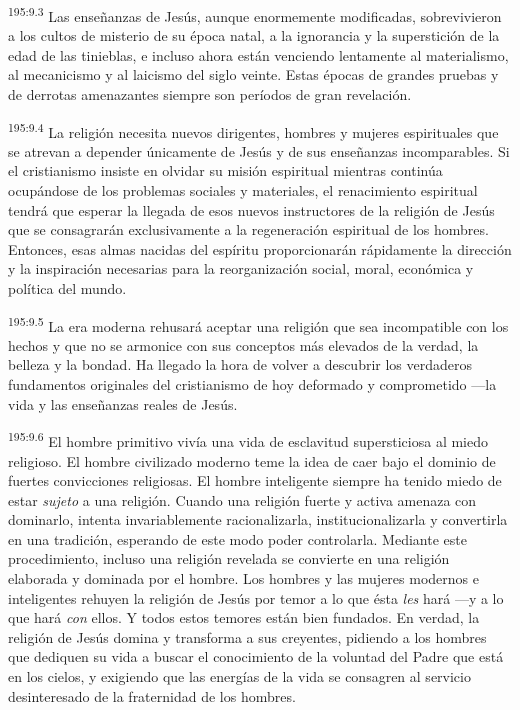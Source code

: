 \par
\textsuperscript{195:9.3} Las enseñanzas de Jesús, aunque enormemente modificadas, sobrevivieron a los cultos de misterio de su época natal, a la ignorancia y la superstición de la edad de las tinieblas, e incluso ahora están venciendo lentamente al materialismo, al mecanicismo y al laicismo del siglo veinte. Estas épocas de grandes pruebas y de derrotas amenazantes siempre son períodos de gran revelación.

\par
\textsuperscript{195:9.4} La religión necesita nuevos dirigentes, hombres y mujeres espirituales que se atrevan a depender únicamente de Jesús y de sus enseñanzas incomparables. Si el cristianismo insiste en olvidar su misión espiritual mientras continúa ocupándose de los problemas sociales y materiales, el renacimiento espiritual tendrá que esperar la llegada de esos nuevos instructores de la religión de Jesús que se consagrarán exclusivamente a la regeneración espiritual de los hombres. Entonces, esas almas nacidas del espíritu proporcionarán rápidamente la dirección y la inspiración necesarias para la reorganización social, moral, económica y política del mundo.

\par
\textsuperscript{195:9.5} La era moderna rehusará aceptar una religión que sea incompatible con los hechos y que no se armonice con sus conceptos más elevados de la verdad, la belleza y la bondad. Ha llegado la hora de volver a descubrir los verdaderos fundamentos originales del cristianismo de hoy deformado y comprometido ---la vida y las enseñanzas reales de Jesús.

\par
\textsuperscript{195:9.6} El hombre primitivo vivía una vida de esclavitud supersticiosa al miedo religioso. El hombre civilizado moderno teme la idea de caer bajo el dominio de fuertes convicciones religiosas. El hombre inteligente siempre ha tenido miedo de estar \textit{sujeto} a una religión. Cuando una religión fuerte y activa amenaza con dominarlo, intenta invariablemente racionalizarla, institucionalizarla y convertirla en una tradición, esperando de este modo poder controlarla. Mediante este procedimiento, incluso una religión revelada se convierte en una religión elaborada y dominada por el hombre. Los hombres y las mujeres modernos e inteligentes rehuyen la religión de Jesús por temor a lo que ésta \textit{les} hará ---y a lo que hará \textit{con} ellos. Y todos estos temores están bien fundados. En verdad, la religión de Jesús domina y transforma a sus creyentes, pidiendo a los hombres que dediquen su vida a buscar el conocimiento de la voluntad del Padre que está en los cielos, y exigiendo que las energías de la vida se consagren al servicio desinteresado de la fraternidad de los hombres.

